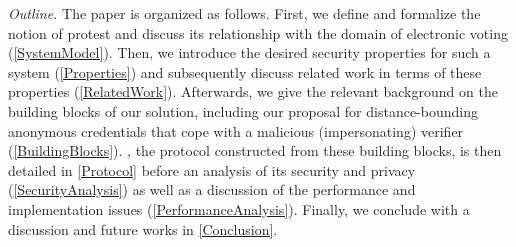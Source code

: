 \emph{Outline.} 
The paper is organized as follows. 
First, we define and formalize the notion of protest and discuss its relationship with the domain of electronic voting (\cref{SystemModel}).  
Then, we introduce the desired security properties for such a system (\cref{Properties}) and subsequently discuss related work in 
terms of these properties (\cref{RelatedWork}). 
Afterwards, we give the relevant background on the building blocks of our solution, including our proposal for distance-bounding anonymous credentials that cope with a malicious (impersonating) verifier (\cref{BuildingBlocks}). 
\PRIVO, the protocol constructed from these building blocks, is then detailed in \cref{Protocol} before an analysis of its security and privacy (\cref{SecurityAnalysis}) as well as a discussion of the performance and implementation issues (\cref{PerformanceAnalysis}). 
Finally, we conclude with a discussion and future works in \cref{Conclusion}.
